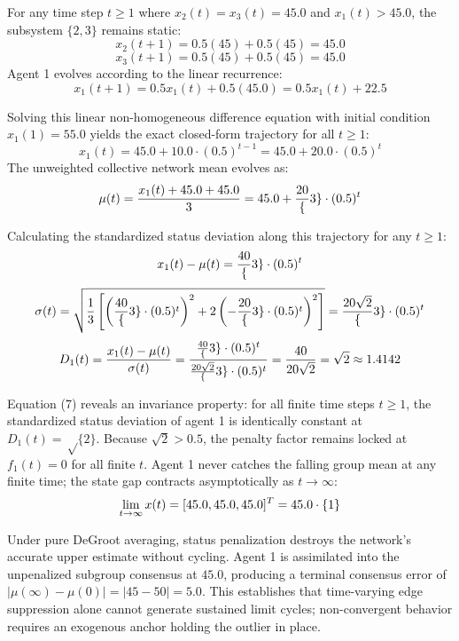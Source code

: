 For any time step $t \ge 1$ where $x_2(t) = x_3(t) = 45.0$ and $x_1(t) > 45.0$, the subsystem $\{2, 3\}$ remains static\cite{acemoglu2013opinion}: $$x_2(t+1) = 0.5(45) + 0.5(45) = 45.0$$ $$x_3(t+1) = 0.5(45) + 0.5(45) = 45.0$$ Agent 1 evolves according to the linear recurrence\cite{acemoglu2013opinion}: $$x_1(t+1) = 0.5 x_1(t) + 0.5(45.0) = 0.5 x_1(t) + 22.5$$

Solving this linear non-homogeneous difference equation with initial condition $x_1(1) = 55.0$ yields the exact closed-form trajectory for all $t \ge 1$\cite{acemoglu2013opinion}: $$x_1(t) = 45.0 + 10.0 \cdot (0.5)^{t-1} = 45.0 + 20.0 \cdot (0.5)^t$$ The unweighted collective network mean evolves as\cite{acemoglu2013opinion}: $$\mu(t) = \frac{x_1(t) + 45.0 + 45.0}{3} = 45.0 + \frac{20}\{3\} \cdot (0.5)^t$$

Calculating the standardized status deviation along this trajectory for any $t \ge 1$\cite{acemoglu2013opinion}: $$x_1(t) - \mu(t) = \frac{40}\{3\} \cdot (0.5)^t$$ $$\sigma(t) = \sqrt{\frac{1}{3} \left[ \left( \frac{40}\{3\} \cdot (0.5)^t \right)^2 + 2 \left( -\frac{20}\{3\} \cdot (0.5)^t \right)^2 \right]} = \frac{20\sqrt{2}}\{3\} \cdot (0.5)^t$$ $$D_1(t) = \frac{x_1(t) - \mu(t)}{\sigma(t)} = \frac{\frac{40}\{3\} \cdot (0.5)^t}{\frac{20\sqrt{2}}\{3\} \cdot (0.5)^t} = \frac{40}{20\sqrt{2}} = \sqrt{2} \approx 1.4142$$

Equation (7) reveals an invariance property: for all finite time steps $t \ge 1$, the standardized status deviation of agent 1 is identically constant at $D_1(t) = \sqrt\{2\}$\cite{acemoglu2013opinion}. Because $\sqrt{2} > 0.5$, the penalty factor remains locked at $f_1(t) = 0$ for all finite $t$\cite{acemoglu2013opinion}. Agent 1 never catches the falling group mean at any finite time; the state gap contracts asymptotically as $t \to \infty$\cite{acemoglu2013opinion}: $$\lim_{t \to \infty} x(t) = [45.0, 45.0, 45.0]^T = 45.0 \cdot \mathbf\{1\}$$

Under pure DeGroot averaging, status penalization destroys the network's accurate upper estimate without cycling\cite{degroot1974reaching}. Agent 1 is assimilated into the unpenalized subgroup consensus at $45.0$, producing a terminal consensus error of $|\mu(\infty) - \mu(0)| = |45 - 50| = 5.0$\cite{degroot1974reaching,acemoglu2013opinion}. This establishes that time-varying edge suppression alone cannot generate sustained limit cycles; non-convergent behavior requires an exogenous anchor holding the outlier in place\cite{degroot1974reaching}.

